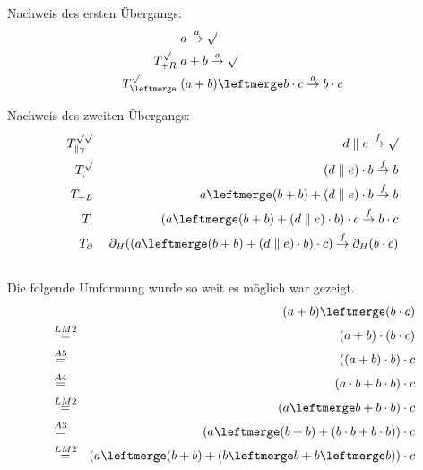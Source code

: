 \documentclass[10pt,a4paper,oneside,ngerman,numbers=noenddot]{scrartcl}
\begin{document}
    \subsection{}
    Nachweis des ersten Übergangs:
    \begin{alignat*}{2}
        &\; a \overset{a}{\rightarrow} \surd \\
        T^{\surd}_{+R} &\; a + b \overset{a}{\rightarrow} \surd \\
        T^{\surd}_{\leftmerge} &\; (a + b) \leftmerge b \cdot c \overset{a}{\rightarrow} b \cdot c
    \end{alignat*}

    Nachweis des zweiten Übergangs:
    \begin{alignat*}{2}
        T_{\parallel \gamma}^{\surd \surd} &&\; d \parallel e \overset{f}{\rightarrow} \surd \\
        T^{\surd}_{.} &&\; (d \parallel e) \cdot b \overset{f}{\rightarrow} b \\
        T_{+L} &&\; a \leftmerge (b + b) + (d \parallel e) \cdot b \overset{f}{\rightarrow} b \\
        T_{.} &&\; (a \leftmerge (b + b) + (d \parallel e) \cdot b) \cdot c \overset{f}{\rightarrow} b \cdot c \\
        T_{\partial} &&\; \partial_H((a \leftmerge (b + b) + (d \parallel e) \cdot b) \cdot c) \overset{f}{\rightarrow} \partial_H(b \cdot c)
    \end{alignat*}

    \subsection{}
    Die folgende Umformung wurde so weit es möglich war gezeigt.
    \begin{alignat*}{2}
        && (a + b) \leftmerge (b \cdot c) \\
        &\overset{LM2}{=}& (a + b) \cdot (b \cdot c) \\
        &\overset{A5}{=}& ((a + b) \cdot b) \cdot c \\
        &\overset{A4}{=}& (a \cdot b + b \cdot b) \cdot c \\
        &\overset{LM2}{=}& (a \leftmerge b + b \cdot b) \cdot c \\
        &\overset{A3}{=}& (a \leftmerge (b + b) + (b \cdot b + b \cdot b)) \cdot c \\
        &\overset{LM2}{=}& (a \leftmerge (b + b) + (b \leftmerge b + b \leftmerge b)) \cdot c
    \end{alignat*}

\setcounter{section}{5}
\section{} %
\end{document}
